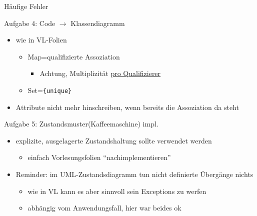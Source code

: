 \documentclass[18pt]{beamer}
\begin{document}
	\begin{frame}{Häufige Fehler}
		\begin{block}{Aufgabe 4: Code $\rightarrow$ Klassendiagramm}
			\begin{itemize}
				\item wie in VL-Folien
				\begin{itemize}
					\item Map=qualifizierte Assoziation
					\begin{itemize}
						\item Achtung, Multiplizität \underline{pro Qualifizierer}
					\end{itemize}
					\item Set=\texttt{\{unique\}}
				\end{itemize}
				\pause
				\item Attribute nicht mehr hinschreiben, wenn bereits die Assoziation da steht
			\end{itemize}
		\end{block}
		\pause
		\begin{block}{Aufgabe 5: Zustandsmuster(Kaffeemaschine) impl.}
			\begin{itemize}
				\item explizite, ausgelagerte Zustandshaltung sollte verwendet werden
				\begin{itemize}
					\item einfach Vorlesungsfolien \enquote{nachimplementieren}
				\end{itemize}
				\item Reminder: im UML-Zustandsdiagramm tun nicht definierte Übergänge nichts
				\begin{itemize}
					\item wie in VL kann es aber sinnvoll sein Exceptions zu werfen
					\item abhängig vom Anwendungsfall, hier war beides ok
				\end{itemize}
			\end{itemize}
		\end{block}
	\end{frame}
\end{document}
